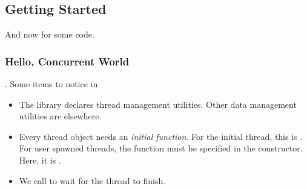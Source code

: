 \subsection{Getting Started}
And now for some code.

\subsubsection{Hello, Concurrent World}
.
Some items to notice in 
\begin{itemize}
  \item The  library declares thread management utilities. Other data management utilities are elsewhere.
  \item Every thread object needs an \emph{initial function}. For the initial thread, this is . For user spawned threads, the function must be specified in the  constructor. Here, it is .
  \item We call  to wait for the thread to finish.
\end{itemize}